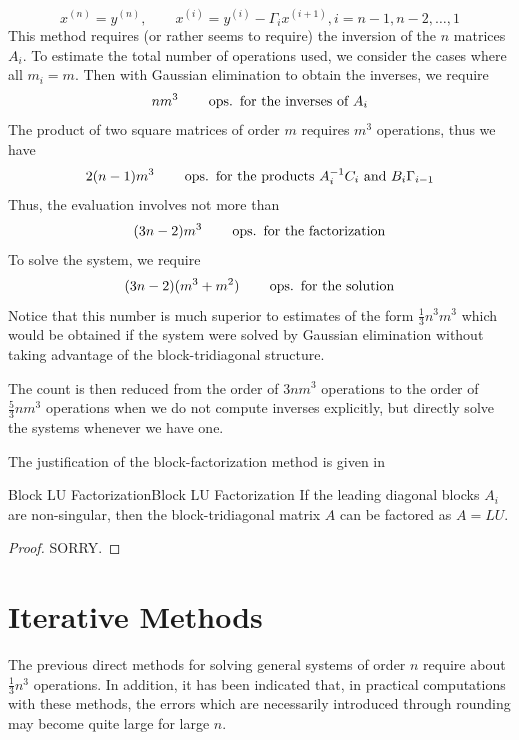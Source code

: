 \documentclass[../main.tex]{subfiles}
\begin{document}
\begin{equation*}
	x^{(n)} = y^{(n)}, \qquad x^{(i)} = y^{(i)} - \Gamma_i x^{(i+1)}, i = n-1, n-2, \ldots, 1
\end{equation*}
This method requires (or rather seems to require) the inversion of the $n$ matrices $A_i$. To estimate the total number of operations used, we consider the cases where all $m_i = m$. Then with Gaussian elimination to obtain the inverses, we require
\begin{equation*}
	n m^3 \qquad \operatorname{ops.} \text{ for the inverses of $A_i$}
\end{equation*}
The product of two square matrices of order $m$ requires $m^3$ operations, thus we have
\begin{equation*}
	2(n - 1)m^3 \qquad \operatorname{ops.} \text{ for the products $A_i^{-1} C_i$ and $B_i \Gamma_{i-1}$}
\end{equation*}
Thus, the evaluation involves not more than
\begin{equation*}
	(3n-2) m^3 \qquad \operatorname{ops.} \text{ for the factorization}
\end{equation*}
To solve the system, we require
\begin{equation*}
	(3n-2) (m^3 + m^2) \qquad \operatorname{ops.} \text{ for the solution}
\end{equation*}
Notice that this number is much superior to estimates of the form $\frac{1}{3}n^3 m^3$ which would be obtained if the system were solved by Gaussian elimination without taking advantage of the block-tridiagonal structure.

The count is then reduced from the order of $3nm^3$ operations to the order of $\frac{5}{3}nm^3$ operations when we do not compute inverses explicitly, but directly solve the systems whenever we have one.

The justification of the block-factorization method is given in
\begin{theorem}{Block LU Factorization}{Block LU Factorization}
	If the leading diagonal blocks $A_i$ are non-singular, then the block-tridiagonal matrix $A$ can be factored as $A = LU$.
\end{theorem}
\begin{proof}
	SORRY.
\end{proof}

\section{Iterative Methods}
The previous direct methods for solving general systems of order $n$ require about $\frac{1}{3} n^3$ operations. In addition, it has been indicated that, in practical computations with these methods, the errors which are necessarily introduced through rounding may become quite large for large $n$.
\end{document}
